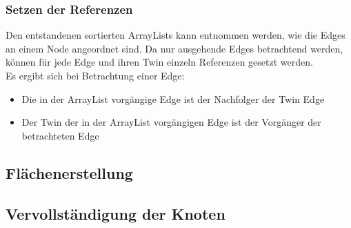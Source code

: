 \subsubsection{Setzen der Referenzen}
Den entstandenen sortierten ArrayLists kann entnommen werden, wie die Edges an einem Node angeordnet sind.
Da nur ausgehende Edges betrachtend werden, können für jede Edge und ihren Twin einzeln Referenzen gesetzt werden.\\ 
Es ergibt sich bei Betrachtung einer Edge:
\begin{itemize}
	\item Die in der ArrayList vorgängige Edge ist der Nachfolger der Twin Edge
	\item Der Twin der in der ArrayList vorgängigen Edge ist der Vorgänger der betrachteten Edge
\end{itemize}

\subsection{Flächenerstellung}

\subsection{Vervollständigung der Knoten}